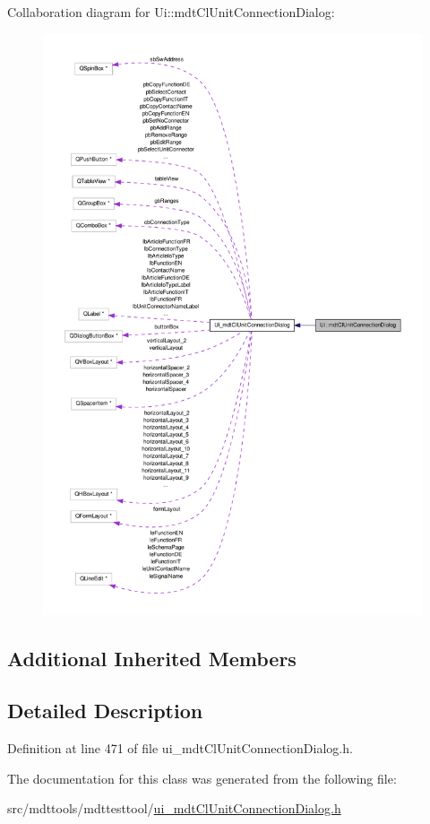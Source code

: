 Collaboration diagram for Ui\-:\-:mdt\-Cl\-Unit\-Connection\-Dialog\-:
\nopagebreak
\begin{figure}[H]
\begin{center}
\leavevmode
\includegraphics[width=350pt]{class_ui_1_1mdt_cl_unit_connection_dialog__coll__graph}
\end{center}
\end{figure}
\subsection*{Additional Inherited Members}


\subsection{Detailed Description}


Definition at line 471 of file ui\-\_\-mdt\-Cl\-Unit\-Connection\-Dialog.\-h.



The documentation for this class was generated from the following file\-:\begin{DoxyCompactItemize}
\item 
src/mdttools/mdttesttool/\hyperlink{ui__mdt_cl_unit_connection_dialog_8h}{ui\-\_\-mdt\-Cl\-Unit\-Connection\-Dialog.\-h}\end{DoxyCompactItemize}
